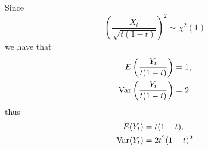 \begin{subproblem}
        \item
        Since
        \[\left(\frac{X_t}{\sqrt{t(1-t)}}\right)^2\sim\chi^2(1)\]
        we have that
        \begin{align*}
            E\left(\frac{Y_t}{t(1-t)}\right)&=1,\\
            \mathrm{Var}\left(\frac{Y_t}{t(1-t)}\right)&=2
        \end{align*}
        thus
        \begin{align*}
            E(Y_t)&=t(1-t),\\
            \mathrm{Var}(Y_t)&=2t^2(1-t)^2
        \end{align*}
    \end{subproblem}